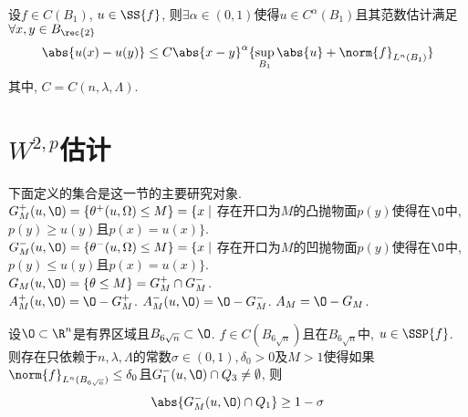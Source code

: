 \begin{corollary}
    设$f \in C(B_1)$, $u \in \SS{f}$, 则$\exists \alpha \in (0, 1)$使得$u \in C^\alpha(B_1)$且其{\Holder}范数估计满足$ \forall x, y \in B_{\rec{2}}$
    \begin{equation}
        \abs{u(x)-u(y)} \le C\abs{x-y}^\alpha\{\sup_{B_1}\abs{u} + \norm{f}_{L^n(B_1)}\}
    \end{equation}
    其中, $C=C(n, \lambda, \Lambda)$.  
\end{corollary}
\section{\texorpdfstring{$W^{2, p}$}{w2p}估计}
\begin{definition}
    下面定义的集合是这一节的主要研究对象.  \\
    $G^+_M(u, \O)=\{\theta^+(u, \Omega) \le M\}= \{ x \mid$ 存在开口为$M$的凸抛物面$p(y)$使得在$\O$中, $p(y) \ge u(y)$且$p(x)=u(x)\}$.  \\
    $G^-_M(u, \O)=\{\theta^-(u, \Omega) \le M\}= \{ x \mid$ 存在开口为$M$的凹抛物面$p(y)$使得在$\O$中, $p(y) \le u(y)$且$p(x)=u(x)\}$.  \\
    $G_M(u, \O)=\{\theta \le M\} = G^+_M \cap G^-_M$.  \\
    $A^+_M(u, \O)=\O-G^+_M$.  $A^-_M(u, \O)=\O-G^-_M$.  $A_M=\O - G_M$.  
\end{definition}
\begin{lemma} \label{lemma516}
    设$\O\subset \R^n$是有界区域且$B_{6\sqrt{n}} \subset \O$.  $f \in C(B_{6\sqrt{n}})$且在$B_{6\sqrt{n}}$中, $u \in \SSP{f}$.  则存在只依赖于$n, \lambda, \Lambda$的常数$\sigma \in (0, 1), \delta_0 >0$及$M>1$使得如果$\norm{f}_{L^n(B_{6\sqrt{n}})} \le \delta_0$且$G^-_1(u, \O) \cap Q_3 \ne \emptyset$, 则 
    \begin{equation}
        \abs{G^-_M(u, \O) \cap Q_1} \ge 1-\sigma
    \end{equation}
\end{lemma}
